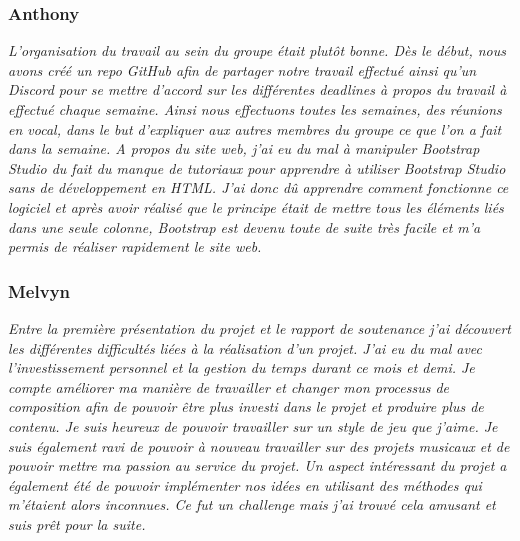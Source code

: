 \documentclass[a4paper,12pt]{article}
\begin{document}
        \subsubsection{Anthony}
        \textit{L’organisation du travail au sein du groupe était plutôt bonne.
        Dès le début, nous avons créé un repo \textsl{GitHub} afin de partager notre travail 
        effectué ainsi qu’un \textsl{Discord} pour se mettre d’accord sur les différentes 
        deadlines à propos du travail à effectué chaque semaine. Ainsi nous 
        effectuons toutes les semaines, des réunions en vocal, dans le but 
        d’expliquer aux autres membres du groupe ce que l’on a fait dans la 
        semaine. A propos du site web, j’ai eu du mal à manipuler \textsl{Bootstrap Studio} 
        du fait du manque de tutoriaux pour apprendre à utiliser \textsl{Bootstrap Studio}
        sans de développement en HTML. J’ai donc dû apprendre comment fonctionne 
        ce logiciel et après avoir réalisé que le principe était de mettre tous 
        les éléments liés dans une seule colonne, \textsl{Bootstrap} est devenu toute de 
        suite très facile et m’a permis de réaliser rapidement le site web.}
  
        \subsubsection{Melvyn}
        \textit{Entre la première présentation du projet et le rapport de soutenance
        j'ai découvert les différentes difficultés liées à la réalisation d'un projet.
        J'ai eu du mal avec l'investissement personnel et la gestion du temps durant 
        ce mois et demi. Je compte améliorer ma manière de travailler et changer mon
        processus de composition afin de pouvoir être plus investi dans le projet et 
        produire plus de contenu. Je suis heureux de pouvoir travailler sur un style de 
        jeu que j'aime. Je suis également ravi de pouvoir à nouveau travailler sur des
        projets musicaux et de pouvoir mettre ma passion au service du projet.
        Un aspect intéressant du projet a également été de pouvoir implémenter nos idées
        en utilisant des méthodes qui m'étaient alors inconnues. Ce fut un challenge 
        mais j'ai trouvé cela amusant et suis prêt pour la suite.}
 
\end{document}
